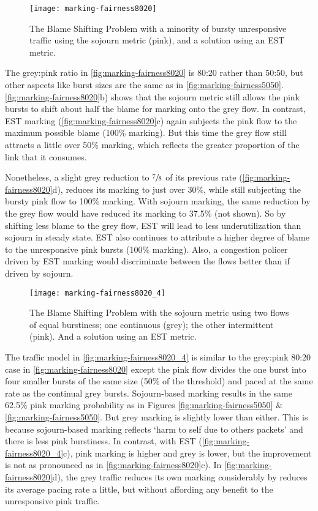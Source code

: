 \begin{figure}[h]
	\centering
	\texttt{[image: marking-fairness8020]}
	\caption{The Blame Shifting Problem with a minority of bursty unresponsive traffic using the sojourn metric (pink), and a solution using an EST metric.}\label{fig:marking-fairness8020}
\end{figure}

The grey:pink ratio in \autoref{fig:marking-fairness8020} is 80:20 rather than 50:50, but other aspects like burst sizes are the same as in \autoref{fig:marking-fairness5050}. \autoref{fig:marking-fairness8020}b) shows that the sojourn metric still allows the pink bursts to shift about half the blame for marking onto the grey flow. In contrast, EST marking (\autoref{fig:marking-fairness8020}c) again subjects the pink flow to the maximum possible blame (100\% marking). But this time the grey flow still attracts a little over 50\% marking, which reflects the greater proportion of the link that it consumes. 

Nonetheless, a slight grey reduction to \(\sfrac{7}{8}\) of its previous rate (\autoref{fig:marking-fairness8020}d), reduces its marking to just over 30\%, while still subjecting the bursty pink flow to 100\% marking. With sojourn marking, the same reduction by the grey flow would have reduced its marking to 37.5\% (not shown). So by shifting less blame to the grey flow, EST will lead to less underutilization than sojourn in steady state. EST also continues to attribute a higher degree of blame to the unresponsive pink bursts (100\% marking). Also, a congestion policer driven by EST marking would discriminate between the flows better than if driven by sojourn.

\begin{figure}[h]
	\centering
	\texttt{[image: marking-fairness8020\_4]}
	\caption{The Blame Shifting Problem with the sojourn metric using two flows of equal burstiness; one continuous (grey); the other intermittent (pink). And a solution using an EST metric.}\label{fig:marking-fairness8020_4}
\end{figure}

The traffic model in \autoref{fig:marking-fairness8020_4} is similar to the grey:pink 80:20 case in \autoref{fig:marking-fairness8020} except the pink flow divides the one burst into four smaller bursts of the same size (50\% of the threshold) and paced at the same rate as the continual grey bursts. Sojourn-based marking results in the same 62.5\% pink marking probability as in Figures \ref{fig:marking-fairness5050} \& \ref{fig:marking-fairness5050}. But grey marking is slightly lower than either. This is because sojourn-based marking reflects `harm to self due to others packets' and there is less pink burstiness. In contrast, with EST (\autoref{fig:marking-fairness8020_4}c), pink marking is higher and grey is lower, but the improvement is not as pronounced as in \autoref{fig:marking-fairness8020}c). In \autoref{fig:marking-fairness8020}d), the grey traffic reduces its own marking considerably by reduces its average pacing rate a little, but without affording any benefit to the unresponsive pink traffic. 

